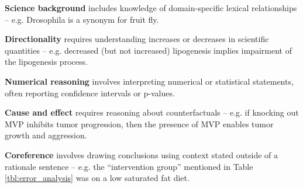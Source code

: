 \begin{description}[leftmargin=*,leftmargin=0pt]
  \item \textbf{Science background} includes knowledge of domain-specific lexical relationships -- e.g. Drosophila is a synonym for fruit fly.
  \item \textbf{Directionality} requires understanding increases or decreases in scientific quantities -- e.g. decreased (but not increased) lipogenesis implies impairment of the lipogenesis process.
  \item \textbf{Numerical reasoning} involves interpreting numerical or statistical statements, often reporting confidence intervals or p-values.
  \item \textbf{Cause and effect} requires reasoning about counterfactuals -- e.g. if knocking out MVP inhibits tumor progression, then the presence of MVP enables tumor growth and aggression.
  \item \textbf{Coreference} involves drawing conclusions using context stated outside of a rationale sentence -- e.g. the ``intervention group'' mentioned in Table \ref{tbl:error_analysis} was on a low saturated fat diet.
\end{description}



